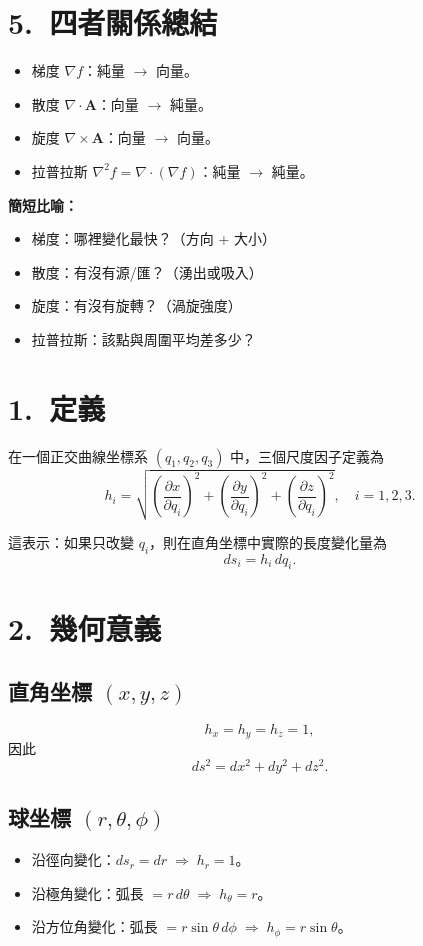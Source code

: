 \documentclass{article}
\begin{document}
\section*{5.~四者關係總結}
\begin{itemize}
    \item 梯度 $\nabla f$：純量 $\to$ 向量。
    \item 散度 $\nabla\cdot\mathbf{A}$：向量 $\to$ 純量。
    \item 旋度 $\nabla\times\mathbf{A}$：向量 $\to$ 向量。
    \item 拉普拉斯 $\nabla^2 f=\nabla\cdot(\nabla f)$：純量 $\to$ 純量。
\end{itemize}

\textbf{簡短比喻：}
\begin{itemize}
    \item 梯度：哪裡變化最快？（方向 + 大小）
    \item 散度：有沒有源/匯？（湧出或吸入）
    \item 旋度：有沒有旋轉？（渦旋強度）
    \item 拉普拉斯：該點與周圍平均差多少？
\end{itemize}
\section*{1.~定義}
在一個正交曲線坐標系 $(q_1,q_2,q_3)$ 中，三個尺度因子定義為
\[
h_i = \sqrt{
\left(\frac{\partial x}{\partial q_i}\right)^2 +
\left(\frac{\partial y}{\partial q_i}\right)^2 +
\left(\frac{\partial z}{\partial q_i}\right)^2
}, \quad i=1,2,3.
\]

這表示：如果只改變 $q_i$，則在直角坐標中實際的長度變化量為
\[
ds_i = h_i \, dq_i.
\]

\section*{2.~幾何意義}
\subsection*{直角坐標 $(x,y,z)$}
\[
h_x = h_y = h_z = 1,
\]
因此
\[
ds^2 = dx^2 + dy^2 + dz^2.
\]

\subsection*{球坐標 $(r,\theta,\phi)$}
\begin{itemize}
    \item 沿徑向變化：$ds_r = dr \;\Rightarrow\; h_r = 1$。
    \item 沿極角變化：弧長 $= r\,d\theta \;\Rightarrow\; h_\theta = r$。
    \item 沿方位角變化：弧長 $= r\sin\theta\,d\phi \;\Rightarrow\; h_\phi = r\sin\theta$。
\end{itemize}
\end{document}
